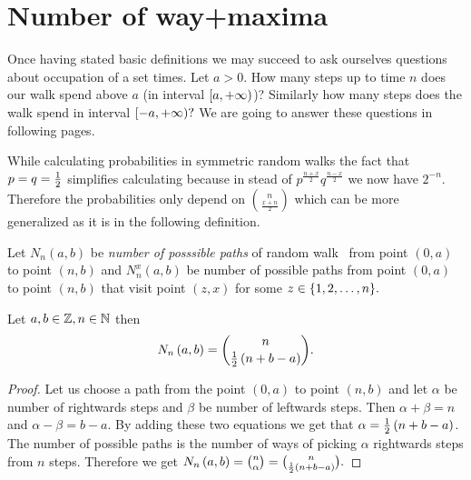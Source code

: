 \chapter{Number of way+maxima}
\begin{rem}
  Once having stated basic definitions we may succeed to ask ourselves questions about occupation of a set times. Let $a>0$. How many steps up to time $n$ does our walk spend above $a$ (in interval $[a,{+\infty})$)? Similarly how many steps does the walk spend in interval $[-a,{+\infty})?$ We are going to answer these questions in following pages.
\end{rem}

\begin{rem}
 While calculating probabilities in symmetric random walks the fact that $p=q=\frac{1}{2}$ simplifies calculating because in stead of $p^{\frac{n+x}{2}}q^{\frac{n-x}{2}}$ we now have $2^{-n}.$ Therefore the probabilities only depend on $\binom{n}{\frac{x+n}{2}}$ which can be more generalized as it is in the following definition.
\end{rem}

\begin{defn}\label{defn-number_possible_paths}
 Let $N_n \left( a,b \right) $ be \emph{number of posssible paths} of random walk \rw\ from point $ \left( 0,a \right) $ to point $ \left( n,b \right)$
 and $N_n^x \left( a,b \right) $ be number of possible paths from point $ \left( 0,a \right) $ to point $\left( n,b \right)$
 that visit point $\left(z,x\right)$ for some $z \in \{1,2,\ldots, n\}.$
\end{defn}
\begin{thm}\label{thm-number_of_possible_paths}
 Let $a,b \in \mathbb{Z}, n \in \mathbb{N}$ then
 \[
    N_n \left( a,b \right) =\binom{n}{\frac{1}{2} \left(n+b-a \right)}.
  \]
\end{thm}
\begin{proof}
 Let us choose a path from the point $ \left( 0,a \right) $ to point $ \left( n,b \right) $ and let $\alpha$ be number of rightwards steps and $\beta$ be number of leftwards steps.
 Then $\alpha+\beta=n$ and $\alpha-\beta=b-a$. By adding these two equations we get that $\alpha=\frac{1}{2} \left( n+b-a \right) $.
 The number of possible paths is the number of ways of picking $\alpha$ rightwards steps from $n$ steps.
 Therefore we get $N_n \left( a,b \right) =\binom{n}{\alpha}=\binom{n}{\frac{1}{2} \left( n+b-a \right) }.$
\end{proof}

